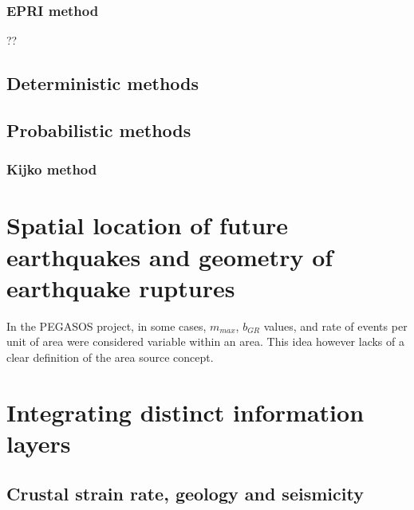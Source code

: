 \subsubsection{EPRI method  \citep{johnston94}}  
??
%
\subsection{Deterministic methods}
%
\subsection{Probabilistic methods}
\subsubsection{Kijko method \citep{kijko04}} 

%
\newpage
\section{Spatial location of future earthquakes and geometry of earthquake 
ruptures}
In the PEGASOS project, in some cases, $m_{max}$, $b_{GR}$ values, and rate of 
events per unit of area were considered variable within an area. This idea however
lacks of a clear definition of the area source concept.

\newpage
\section{Integrating distinct information layers}
\subsection{Crustal strain rate, geology and seismicity}
\subsubsection{\cite{ward94}}

